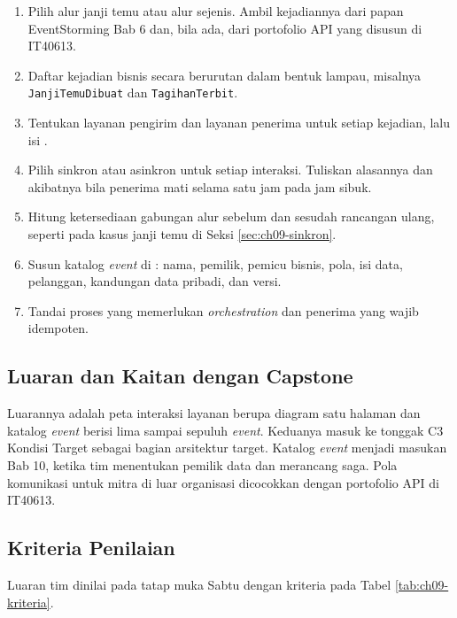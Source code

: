 \begin{enumerate}
  \item Pilih alur janji temu atau alur sejenis. Ambil kejadiannya dari papan EventStorming Bab 6
        dan, bila ada, dari portofolio API yang disusun di IT40613.
  \item Daftar kejadian bisnis secara berurutan dalam bentuk lampau, misalnya
        \texttt{JanjiTemuDibuat} dan \texttt{TagihanTerbit}.
  \item Tentukan layanan pengirim dan layanan penerima untuk setiap kejadian, lalu isi
        .
  \item Pilih sinkron atau asinkron untuk setiap interaksi. Tuliskan alasannya dan akibatnya bila
        penerima mati selama satu jam pada jam sibuk.
  \item Hitung ketersediaan gabungan alur sebelum dan sesudah rancangan ulang, seperti pada kasus
        janji temu di Seksi \ref{sec:ch09-sinkron}.
  \item Susun katalog \textit{event} di :
        nama, pemilik, pemicu bisnis, pola, isi data, pelanggan, kandungan data pribadi, dan versi.
  \item Tandai proses yang memerlukan \textit{orchestration} dan penerima yang wajib idempoten.
\end{enumerate}

\subsection*{Luaran dan Kaitan dengan Capstone}

Luarannya adalah peta interaksi layanan berupa diagram satu halaman dan katalog \textit{event}
berisi lima sampai sepuluh \textit{event}. Keduanya masuk ke tonggak C3 Kondisi Target sebagai
bagian arsitektur target. Katalog \textit{event} menjadi masukan Bab 10, ketika tim menentukan
pemilik data dan merancang saga. Pola komunikasi untuk mitra di luar organisasi dicocokkan dengan
portofolio API di IT40613.

\subsection*{Kriteria Penilaian}

Luaran tim dinilai pada tatap muka Sabtu dengan kriteria pada Tabel \ref{tab:ch09-kriteria}.


